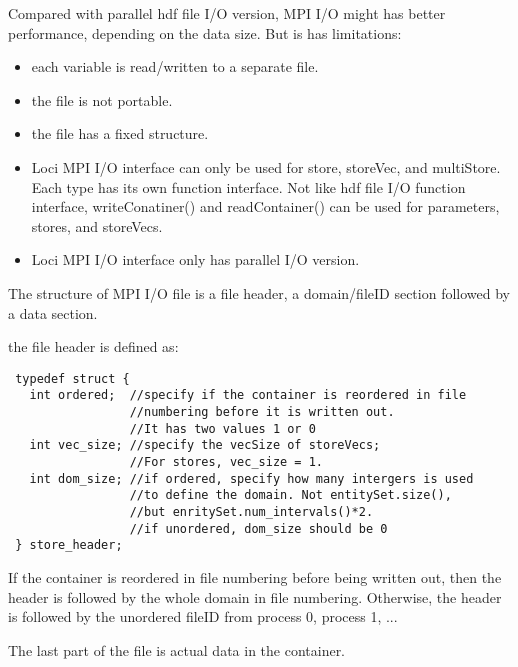 \documentclass{article}
\begin{document}
 Compared with parallel hdf file I/O version,  MPI I/O might has
better performance, depending on the data size. But is has limitations: 

\begin{itemize} 
\item each variable is read/written to a separate file.
\item the file is not portable.
\item the file has a fixed structure.
\item Loci MPI I/O interface can only be used for store, storeVec, and multiStore. Each
  type has its own function interface. Not like hdf file I/O function
  interface, writeConatiner() and readContainer() can be used for
  parameters, stores, and storeVecs.    
\item Loci MPI I/O interface only has parallel I/O version. 
\end{itemize}

The structure of MPI I/O file is a file header, a domain/fileID section
followed by a data section.
 
the file header is defined as:

 \begin{lstlisting}
 typedef struct {
   int ordered;  //specify if the container is reordered in file
                 //numbering before it is written out.
                 //It has two values 1 or 0
   int vec_size; //specify the vecSize of storeVecs;
                 //For stores, vec_size = 1.  
   int dom_size; //if ordered, specify how many intergers is used
                 //to define the domain. Not entitySet.size(), 
                 //but enritySet.num_intervals()*2.  
                 //if unordered, dom_size should be 0
 } store_header;
\end{lstlisting}  

 If the container is reordered in file
numbering before being written out, then the header is followed by the whole domain
in file numbering. Otherwise, the header is followed by the unordered
fileID from process 0, process 1, ...

The last part of the file is actual data in the container.    
\end{document}

